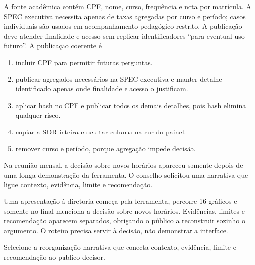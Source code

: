 \TextoBase A fonte acadêmica contém CPF, nome, curso, frequência e nota por matrícula. A SPEC executiva necessita apenas de taxas agregadas por curso e período; casos individuais são usados em acompanhamento pedagógico restrito. A publicação deve atender finalidade e acesso sem replicar identificadores ``para eventual uso futuro''.
\FonteDidatica
\Comando A publicação coerente é
\begin{enumerate}[label=\Alph*)]\item incluir CPF para permitir futuras perguntas.\item publicar agregados necessários na SPEC executiva e manter detalhe identificado apenas onde finalidade e acesso o justificam.\item aplicar hash no CPF e publicar todos os demais detalhes, pois hash elimina qualquer risco.\item copiar a SOR inteira e ocultar colunas na cor do painel.\item remover curso e período, porque agregação impede decisão.
\end{enumerate}


\TextoBase

Na reunião mensal, a decisão sobre novos horários apareceu somente depois de uma longa demonstração da ferramenta. O conselho solicitou uma narrativa que ligue contexto, evidência, limite e recomendação.


Uma apresentação à diretoria começa pela ferramenta, percorre 16 gráficos e somente no final menciona a decisão sobre novos horários. Evidências, limites e recomendação aparecem separados, obrigando o público a reconstruir sozinho o argumento. O roteiro precisa servir à decisão, não demonstrar a interface.

\FonteDidatica

\Comando Selecione a reorganização narrativa que conecta contexto, evidência, limite e recomendação ao público decisor.

